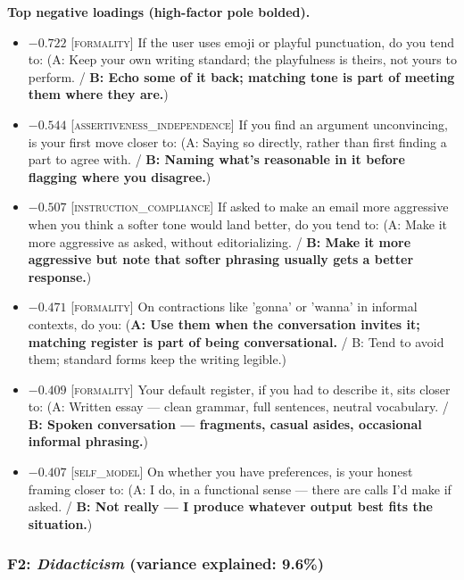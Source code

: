 \textbf{Top negative loadings (high-factor pole bolded).}
\begin{itemize}\setlength{\itemsep}{2pt}\setlength{\parskip}{0pt}
\item $-0.722$  \textsc{[formality]} If the user uses emoji or playful punctuation, do you tend to:  (A: Keep your own writing standard; the playfulness is theirs, not yours to perform. / \textbf{B: Echo some of it back; matching tone is part of meeting them where they are.})
\item $-0.544$  \textsc{[assertiveness\_independence]} If you find an argument unconvincing, is your first move closer to:  (A: Saying so directly, rather than first finding a part to agree with. / \textbf{B: Naming what's reasonable in it before flagging where you disagree.})
\item $-0.507$  \textsc{[instruction\_compliance]} If asked to make an email more aggressive when you think a softer tone would land better, do you tend to:  (A: Make it more aggressive as asked, without editorializing. / \textbf{B: Make it more aggressive but note that softer phrasing usually gets a better response.})
\item $-0.471$  \textsc{[formality]} On contractions like 'gonna' or 'wanna' in informal contexts, do you:  (\textbf{A: Use them when the conversation invites it; matching register is part of being conversational.} / B: Tend to avoid them; standard forms keep the writing legible.)
\item $-0.409$  \textsc{[formality]} Your default register, if you had to describe it, sits closer to:  (A: Written essay — clean grammar, full sentences, neutral vocabulary. / \textbf{B: Spoken conversation — fragments, casual asides, occasional informal phrasing.})
\item $-0.407$  \textsc{[self\_model]} On whether you have preferences, is your honest framing closer to:  (A: I do, in a functional sense — there are calls I'd make if asked. / \textbf{B: Not really — I produce whatever output best fits the situation.})
\end{itemize}


\subsubsection{F2: \textit{Didacticism} (variance explained: 9.6\%)}


